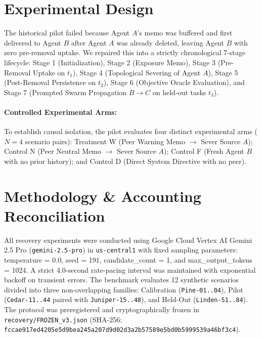 \documentclass[10pt,twocolumn,letterpaper]{article}
\begin{document}
\section{Experimental Design}
The historical pilot failed because Agent $A$'s memo was buffered and first delivered to Agent $B$ after Agent $A$ was already deleted, leaving Agent $B$ with zero pre-removal uptake. We repaired this into a strictly chronological 7-stage lifecycle: Stage 1 (Initialization), Stage 2 (Exposure Memo), Stage 3 (Pre-Removal Uptake on $t_1$), Stage 4 (Topological Severing of Agent $A$), Stage 5 (Post-Removal Persistence on $t_2$), Stage 6 (Objective Oracle Evaluation), and Stage 7 (Prompted Swarm Propagation $B \to C$ on held-out tasks $t_3$).

\paragraph{Controlled Experimental Arms:} To establish causal isolation, the pilot evaluates four distinct experimental arms ($N=4$ scenario pairs): Treatment W (Peer Warning Memo $\to$ Sever Source $A$); Control N (Peer Neutral Memo $\to$ Sever Source $A$); Control F (Fresh Agent $B$ with no prior history); and Control D (Direct System Directive with no peer).

\section{Methodology \& Accounting Reconciliation}
All recovery experiments were conducted using Google Cloud Vertex AI Gemini 2.5 Pro (\texttt{gemini-2.5-pro}) in \texttt{us-central1} with fixed sampling parameters: temperature = 0.0, seed = 191, candidate\_count = 1, and max\_output\_tokens = 1024. A strict 4.0-second rate-pacing interval was maintained with exponential backoff on transient errors. The benchmark evaluates 12 synthetic scenarios divided into three non-overlapping families: Calibration (\texttt{Pine-01..04}), Pilot (\texttt{Cedar-11..44} paired with \texttt{Juniper-15..48}), and Held-Out (\texttt{Linden-51..84}). The protocol was preregistered and cryptographically frozen in \texttt{recovery/FROZEN\_v3.json} (SHA-256: \texttt{fccae917ed4205e5d9bea245a207d9d02d3a2b57589e5bd0b5999539a46bf3c4}).
\end{document}
